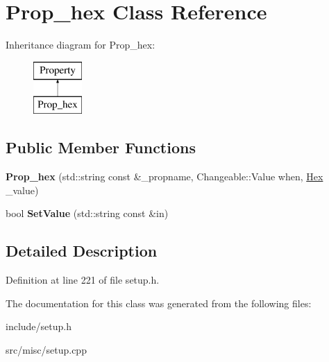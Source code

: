 \hypertarget{classProp__hex}{\section{Prop\-\_\-hex Class Reference}
\label{classProp__hex}
}
Inheritance diagram for Prop\-\_\-hex\-:\begin{figure}[H]
\begin{center}
\leavevmode
\includegraphics[height=2.000000cm]{classProp__hex}
\end{center}
\end{figure}
\subsection*{Public Member Functions}
\begin{DoxyCompactItemize}
\item 
\hypertarget{classProp__hex_a5a9df57c5efae0c495056cda181ccf40}{{\bfseries Prop\-\_\-hex} (std\-::string const \&\-\_\-propname, Changeable\-::\-Value when, \hyperlink{classHex}{Hex} \-\_\-value)}\label{classProp__hex_a5a9df57c5efae0c495056cda181ccf40}

\item 
\hypertarget{classProp__hex_ab1461b9f682fa0aac1e45d544905aaed}{bool {\bfseries Set\-Value} (std\-::string const \&in)}\label{classProp__hex_ab1461b9f682fa0aac1e45d544905aaed}

\end{DoxyCompactItemize}


\subsection{Detailed Description}


Definition at line 221 of file setup.\-h.



The documentation for this class was generated from the following files\-:\begin{DoxyCompactItemize}
\item 
include/setup.\-h\item 
src/misc/setup.\-cpp\end{DoxyCompactItemize}
